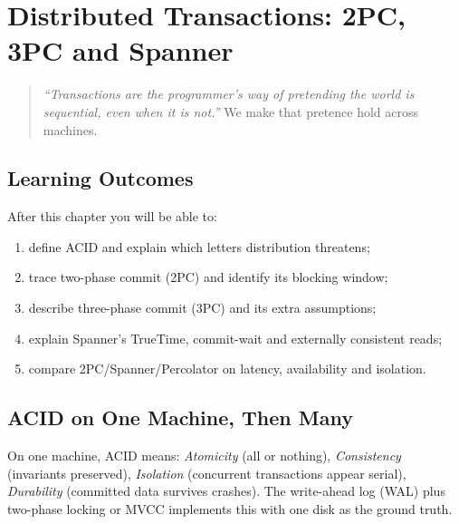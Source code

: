 \chapter{Distributed Transactions: 2PC, 3PC and Spanner}
\label{ch:transactions}

\begin{quote}
\emph{``Transactions are the programmer's way of pretending the world is sequential, even when it is not.''} We make that pretence hold across machines.
\end{quote}

\noindent{}
\vspace{0.4em}

\section*{Learning Outcomes}
After this chapter you will be able to:
\begin{enumerate}[label=(L\arabic*)]
    \item define ACID and explain which letters distribution threatens;
    \item trace two-phase commit (2PC) and identify its blocking window;
    \item describe three-phase commit (3PC) and its extra assumptions;
    \item explain Spanner's TrueTime, commit-wait and externally consistent reads;
    \item compare 2PC/Spanner/Percolator on latency, availability and isolation.
\end{enumerate}

\section{ACID on One Machine, Then Many}
\label{sec:acid}
On one machine, ACID means: \emph{Atomicity} (all or nothing), \emph{Consistency} (invariants preserved), \emph{Isolation} (concurrent transactions appear serial), \emph{Durability} (committed data survives crashes). The write-ahead log (WAL) plus two-phase locking or MVCC implements this with one disk as the ground truth.

